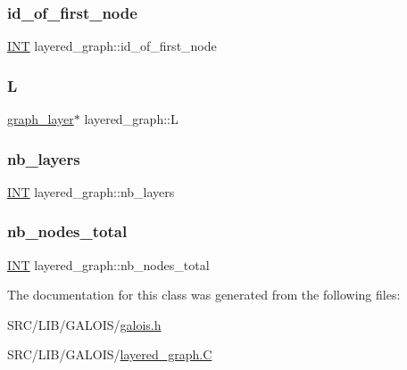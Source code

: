 \subsubsection{\texorpdfstring{id\+\_\+of\+\_\+first\+\_\+node}{id\_of\_first\_node}}
{\footnotesize\ttfamily \mbox{\hyperlink{galois_8h_a09fddde158a3a20bd2dcadb609de11dc}{I\+NT}} layered\+\_\+graph\+::id\+\_\+of\+\_\+first\+\_\+node}

\mbox{\label{classlayered__graph_a96d0e46ee39b44323a1c25a6c9826f27}} 
\subsubsection{\texorpdfstring{L}{L}}
{\footnotesize\ttfamily \mbox{\hyperlink{classgraph__layer}{graph\+\_\+layer}}$\ast$ layered\+\_\+graph\+::L}

\mbox{\label{classlayered__graph_a902d543943821786b2f2bff5d776b0cd}} 
\subsubsection{\texorpdfstring{nb\+\_\+layers}{nb\_layers}}
{\footnotesize\ttfamily \mbox{\hyperlink{galois_8h_a09fddde158a3a20bd2dcadb609de11dc}{I\+NT}} layered\+\_\+graph\+::nb\+\_\+layers}

\mbox{\label{classlayered__graph_a459fd6ca3b0f6f6943adca6f30986440}} 
\subsubsection{\texorpdfstring{nb\+\_\+nodes\+\_\+total}{nb\_nodes\_total}}
{\footnotesize\ttfamily \mbox{\hyperlink{galois_8h_a09fddde158a3a20bd2dcadb609de11dc}{I\+NT}} layered\+\_\+graph\+::nb\+\_\+nodes\+\_\+total}



The documentation for this class was generated from the following files\+:\begin{DoxyCompactItemize}
\item 
S\+R\+C/\+L\+I\+B/\+G\+A\+L\+O\+I\+S/\mbox{\hyperlink{galois_8h}{galois.\+h}}\item 
S\+R\+C/\+L\+I\+B/\+G\+A\+L\+O\+I\+S/\mbox{\hyperlink{layered__graph_8_c}{layered\+\_\+graph.\+C}}\end{DoxyCompactItemize}
